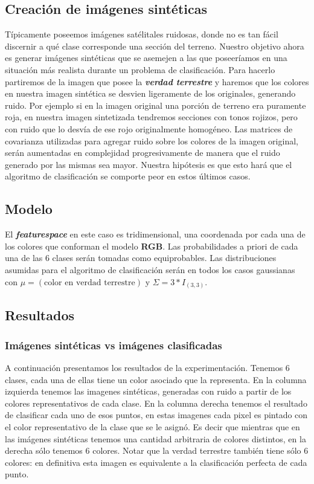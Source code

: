 \subsection{Creación de imágenes sintéticas}
Típicamente poseemos imágenes satélitales ruidosas, donde no es tan fácil discernir a qué clase corresponde una sección del terreno. Nuestro objetivo ahora es generar imágenes sintéticas que se asemejen a las que poseeríamos en una situación más realista durante un problema de clasificación. Para hacerlo partiremos de la imagen que posee la \textit{\textbf{verdad terrestre}} y haremos que los colores en nuestra imagen sintética se desvien ligeramente de los originales, generando ruido. Por ejemplo si en la imagen original una porción de terreno era puramente roja, en nuestra imagen sintetizada tendremos secciones con tonos rojizos, pero con ruido que lo desvía de ese rojo originalmente homogéneo. Las matrices de covarianza utilizadas para agregar ruido sobre los colores de la imagen original, serán aumentadas en complejidad progresivamente de manera que el ruido generado por las mismas sea mayor. Nuestra hipótesis es que esto hará que el algoritmo de clasificación se comporte peor en estos últimos casos.

\subsection{Modelo}
El \textit{\textbf{featurespace}} en este caso es tridimensional, una coordenada por cada una de los colores que conforman el modelo \textbf{RGB}. Las probabilidades a priori de cada una de las 6 clases serán tomadas como equiprobables. Las distribuciones asumidas para el algoritmo de clasificación serán en todos los casos gaussianas con $\mu=(\textrm{color en verdad terrestre})$ y $\Sigma=3*I_{(3,3)}$.

\subsection{Resultados}
\subsubsection{Imágenes sintéticas vs imágenes clasificadas}
A continuación presentamos los resultados de la experimentación. Tenemos 6 clases, cada una de ellas tiene un color asociado que la representa. En la columna izquierda tenemos las imagenes sintéticas, generadas con ruido a partir de los colores representativos de cada clase. En la columna derecha tenemos el resultado de clasificar cada uno de esos puntos, en estas imagenes cada pixel es pintado con el color representativo de la clase que se le asignó. Es decir que mientras que en las imágenes sintéticas tenemos una cantidad arbitraria de colores distintos, en la derecha sólo tenemos 6 colores. Notar que la verdad terrestre también tiene sólo 6 colores: en definitiva esta imagen es equivalente a la clasificación perfecta de cada punto. 

